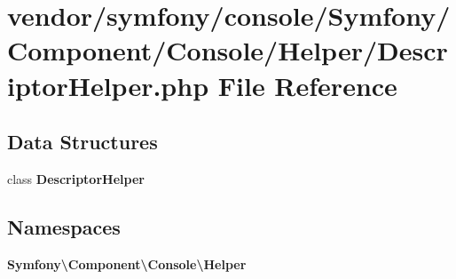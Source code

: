 \section{vendor/symfony/console/\+Symfony/\+Component/\+Console/\+Helper/\+Descriptor\+Helper.php File Reference}
\label{_descriptor_helper_8php}
\subsection*{Data Structures}
\begin{DoxyCompactItemize}
\item 
class {\bf Descriptor\+Helper}
\end{DoxyCompactItemize}
\subsection*{Namespaces}
\begin{DoxyCompactItemize}
\item 
 {\bf Symfony\textbackslash{}\+Component\textbackslash{}\+Console\textbackslash{}\+Helper}
\end{DoxyCompactItemize}
